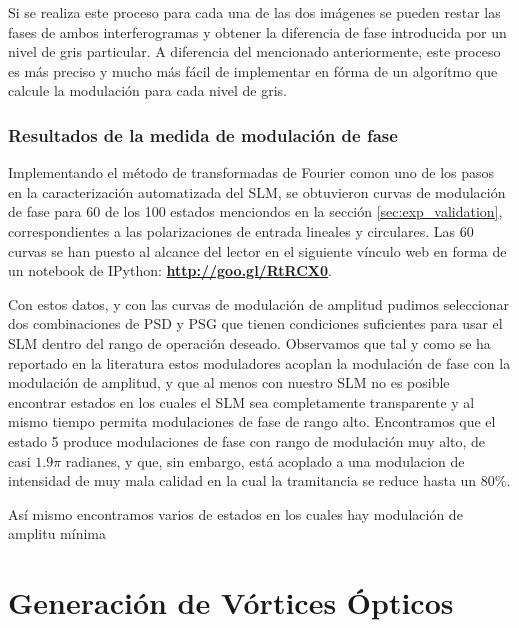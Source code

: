 Si se realiza este proceso para cada una de las dos imágenes se pueden restar las
fases de ambos interferogramas y obtener la diferencia de fase
introducida por un nivel de gris particular. A diferencia del
mencionado anteriormente, este proceso es más preciso y mucho más fácil de implementar en fórma de
un algorítmo que calcule la modulación para cada nivel de gris. 
\pagebreak
\subsection{Resultados de la medida de modulación de fase}

Implementando el método de transformadas de Fourier comon uno de los
pasos en la caracterización automatizada del SLM, se obtuvieron curvas de modulación
de fase para 60 de los 100 estados menciondos en la sección
\ref{sec:exp_validation}, correspondientes a las polarizaciones de
entrada lineales y circulares.  Las 60 curvas se han puesto al alcance del
lector en el siguiente vínculo web en forma de un notebook de IPython:
\href{http://goo.gl/RtRCX0}{\textbf{http://goo.gl/RtRCX0}}.  

Con estos datos, y con las curvas de modulación de amplitud pudimos
seleccionar dos combinaciones de PSD y PSG que tienen condiciones
suficientes para usar el SLM dentro del rango de operación
deseado. Observamos que tal y como se ha reportado en la literatura
estos moduladores acoplan la modulación de fase con la modulación de
amplitud, y que al menos con nuestro SLM no es posible encontrar
estados en los cuales el SLM sea completamente transparente y al mismo
tiempo permita modulaciones de fase de rango alto.  
Encontramos que el estado 5 produce modulaciones de fase con rango de
modulación muy alto, de casi $1.9\pi$
radianes, y que, sin embargo, está acoplado a una modulacion de intensidad de muy mala calidad en
la cual la tramitancia se reduce hasta un $80\%$.


Así mismo encontramos varios de estados en los cuales hay modulación
de amplitu mínima


\chapter{Generación de Vórtices Ópticos}
\label{sec:OV_gen}


